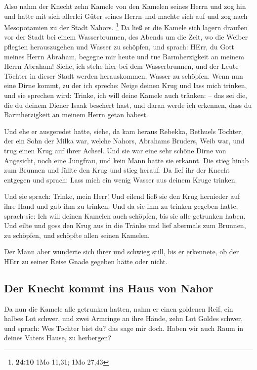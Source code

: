  Also nahm der Knecht zehn Kamele von den Kamelen seines
Herrn und zog hin und hatte mit sich allerlei Güter seines Herrn und
machte sich auf und zog nach Mesopotamien zu der Stadt Nahors.
\footnote{\textbf{24:10} 1Mo 11,31; 1Mo 27,43}  Da ließ
er die Kamele sich lagern draußen vor der Stadt bei einem Wasserbrunnen,
des Abends um die Zeit, wo die Weiber pflegten herauszugehen und Wasser
zu schöpfen,  und sprach: HErr, du Gott meines Herrn
Abraham, begegne mir heute und tue Barmherzigkeit an meinem Herrn
Abraham!  Siehe, ich stehe hier bei dem Wasserbrunnen,
und der Leute Töchter in dieser Stadt werden herauskommen, Wasser zu
schöpfen.  Wenn nun eine Dirne kommt, zu der ich spreche:
Neige deinen Krug und lass mich trinken, und sie sprechen wird: Trinke,
ich will deine Kamele auch tränken: -- das sei die, die du deinem Diener
Isaak beschert hast, und daran werde ich erkennen, dass du
Barmherzigkeit an meinem Herrn getan habest.

 Und ehe er ausgeredet hatte, siehe, da kam heraus
Rebekka, Bethuels Tochter, der ein Sohn der Milka war, welche Nahors,
Abrahams Bruders, Weib war, und trug einen Krug auf ihrer Achsel.
 Und sie war eine sehr schöne Dirne von Angesicht, noch
eine Jungfrau, und kein Mann hatte sie erkannt. Die stieg hinab zum
Brunnen und füllte den Krug und stieg herauf.  Da lief
ihr der Knecht entgegen und sprach: Lass mich ein wenig Wasser aus
deinem Kruge trinken.

 Und sie sprach: Trinke, mein Herr! Und eilend ließ sie
den Krug hernieder auf ihre Hand und gab ihm zu trinken. 
Und da sie ihm zu trinken gegeben hatte, sprach sie: Ich will deinen
Kamelen auch schöpfen, bis sie alle getrunken haben.  Und
eilte und goss den Krug aus in die Tränke und lief abermals zum Brunnen,
zu schöpfen, und schöpfte allen seinen Kamelen.

 Der Mann aber wunderte sich ihrer und schwieg still, bis
er erkennete, ob der HErr zu seiner Reise Gnade gegeben hätte oder
nicht.

\hypertarget{der-knecht-kommt-ins-haus-von-nahor}{%
\subsection{Der Knecht kommt ins Haus von
Nahor}\label{der-knecht-kommt-ins-haus-von-nahor}}

 Da nun die Kamele alle getrunken hatten, nahm er einen
goldenen Reif, ein halbes Lot schwer, und zwei Armringe an ihre Hände,
zehn Lot Goldes schwer,  und sprach: Wes Tochter bist du?
das sage mir doch. Haben wir auch Raum in deines Vaters Hause, zu
herbergen?


